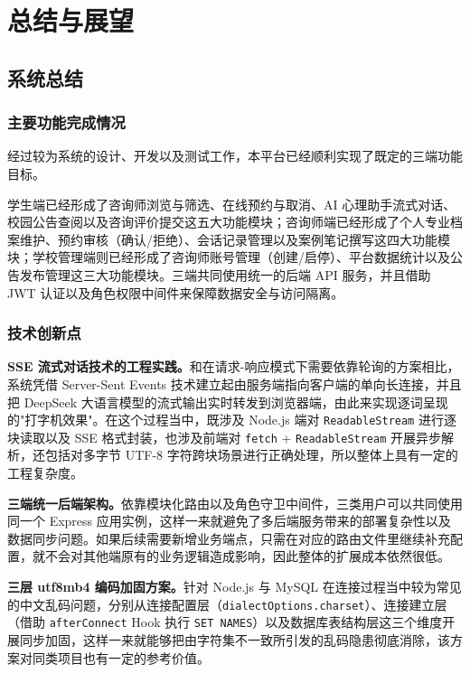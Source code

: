 \chapter{总结与展望}

\section{系统总结}

\subsection{主要功能完成情况}

经过较为系统的设计、开发以及测试工作，本平台已经顺利实现了既定的三端功能目标。

学生端已经形成了咨询师浏览与筛选、在线预约与取消、AI 心理助手流式对话、校园公告查阅以及咨询评价提交这五大功能模块；咨询师端已经形成了个人专业档案维护、预约审核（确认/拒绝）、会话记录管理以及案例笔记撰写这四大功能模块；学校管理端则已经形成了咨询师账号管理（创建/启停）、平台数据统计以及公告发布管理这三大功能模块。三端共同使用统一的后端 API 服务，并且借助 JWT 认证以及角色权限中间件来保障数据安全与访问隔离。

\subsection{技术创新点}

\textbf{SSE 流式对话技术的工程实践。}和在请求-响应模式下需要依靠轮询的方案相比，系统凭借 Server-Sent Events 技术建立起由服务端指向客户端的单向长连接，并且把 DeepSeek 大语言模型的流式输出实时转发到浏览器端，由此来实现逐词呈现的"打字机效果"。在这个过程当中，既涉及 Node.js 端对 \texttt{ReadableStream} 进行逐块读取以及 SSE 格式封装，也涉及前端对 \texttt{fetch} + \texttt{ReadableStream} 开展异步解析，还包括对多字节 UTF-8 字符跨块场景进行正确处理，所以整体上具有一定的工程复杂度。

\textbf{三端统一后端架构。}依靠模块化路由以及角色守卫中间件，三类用户可以共同使用同一个 Express 应用实例，这样一来就避免了多后端服务带来的部署复杂性以及数据同步问题。如果后续需要新增业务端点，只需在对应的路由文件里继续补充配置，就不会对其他端原有的业务逻辑造成影响，因此整体的扩展成本依然很低。

\textbf{三层 utf8mb4 编码加固方案。}针对 Node.js 与 MySQL 在连接过程当中较为常见的中文乱码问题，分别从连接配置层（\texttt{dialectOptions.charset}）、连接建立层（借助 \texttt{afterConnect} Hook 执行 \texttt{SET NAMES}）以及数据库表结构层这三个维度开展同步加固，这样一来就能够把由字符集不一致所引发的乱码隐患彻底消除，该方案对同类项目也有一定的参考价值。

